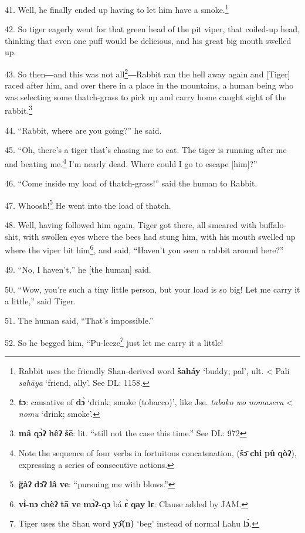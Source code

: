 41. Well, he finally ended up having to let him have a smoke.\footnote{Rabbit uses the friendly Shan-derived word \textbf{šaháy} `buddy; pal', ult. < Pali \textit{sahāya} `friend, ally'. See DL: 1158.}

42. So tiger eagerly went for that green head of the pit viper, that coiled-up
head, thinking that even one puff would be delicious, and his great big mouth swelled up.

43. So then―and this was not all\footnote{\textbf{tɔ}: causative of \textbf{dɔ̀} `drink; smoke (tobacco)', like Jse. \textit{tabako wo nomaseru} < \textit{nomu} `drink; smoke'.}―Rabbit ran the hell away again and [Tiger]
raced after him, and over there in a place in the mountains, a human being who was selecting some thatch-grass to pick up and carry home caught sight
of the rabbit.\footnote{\textbf{mâ} \textbf{qɔ̀ʔ} \textbf{hêʔ} \textbf{šē}: lit. ``still not the case this time.'' See DL: 972}

44. ``Rabbit, where are you going?'' he said.

45. ``Oh, there's a tiger that's chasing me to eat. The tiger is running after
me and beating me.\footnote{Note the sequence of four verbs in fortuitous concatenation, (\textbf{šɔ̄} \textbf{chi} \textbf{pû} \textbf{qòʔ}), expressing a series of consecutive actions.} I'm nearly dead. Where could I go to escape [him]?''

46. ``Come inside my load of thatch-grass!'' said the human to Rabbit.

47. Whoosh!\footnote{\textbf{g̈àʔ} \textbf{dɔ̂ʔ} \textbf{lâ} \textbf{ve}: ``pursuing me with blows.''} He went into the load of thatch.

48. Well, having followed him again, Tiger got there, all smeared with buffalo-shit,
with swollen eyes where the bees had stung him, with his mouth swelled up where
the viper bit him\footnote{\textbf{vɨ̀-nɔ} \textbf{chèʔ} \textbf{tā} \textbf{ve} \textbf{mɔ̀ʔ-qɔ} bá \textbf{ɛ̀} \textbf{qay} \textbf{lɛ}: Clause added by JAM.}, and said, ``Haven't you seen a rabbit around here?''

49. ``No, I haven't,'' he [the human] said.

50. ``Wow, you're such a tiny little person, but your load is so big! Let me carry
it a little,'' said Tiger.

51. The human said, ``That's impossible.''

52. So he begged him, ``Pu-leeze\footnote{Tiger uses the Shan word \textbf{yɔ̂(n)} `beg' instead of normal Lahu \textbf{lɔ̀}.} just let me carry it a little!


